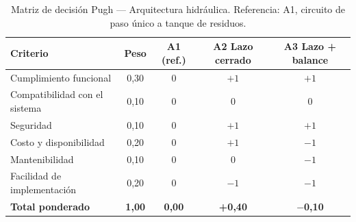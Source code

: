 \begin{table}[H]
\centering
\caption{Matriz de decisión Pugh --- Arquitectura hidráulica. Referencia: A1, circuito de paso único a tanque de residuos.}
\label{tab:pugh-arquitectura}
\begin{tabularx}{\textwidth}{Xcccc}
\toprule
\textbf{Criterio} & \textbf{Peso} & \textbf{A1 (ref.)} & \textbf{A2 Lazo cerrado} & \textbf{A3 Lazo + balance} \\
\midrule
Cumplimiento funcional        & 0,30 & 0 & $+1$ & $+1$ \\
Compatibilidad con el sistema & 0,10 & 0 & 0    & 0 \\
Seguridad                     & 0,10 & 0 & $+1$ & $+1$ \\
Costo y disponibilidad        & 0,20 & 0 & $+1$ & $-1$ \\
Mantenibilidad                & 0,10 & 0 & 0    & $-1$ \\
Facilidad de implementación   & 0,20 & 0 & $-1$ & $-1$ \\
\midrule
\textbf{Total ponderado}      & \textbf{1,00} & \textbf{0,00} & \textbf{+0,40} & \textbf{$-$0,10} \\
\bottomrule
\end{tabularx}
\end{table}
